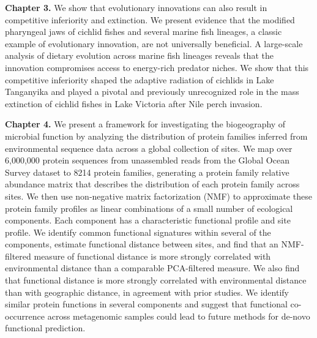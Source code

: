 \noindent\textbf{Chapter 3.} We show that evolutionary innovations can
also result in competitive inferiority and extinction. We present evidence
that the modified pharyngeal jaws of cichlid fishes and several marine fish
lineages, a classic example of evolutionary innovation, are not universally
beneficial. A large-scale analysis of dietary evolution across marine fish
lineages reveals that the innovation compromises access to energy-rich
predator niches. We show that this competitive inferiority shaped the adaptive
radiation of cichlids in Lake Tanganyika and played a pivotal and previously
unrecognized role in the mass extinction of cichlid fishes in Lake Victoria
after Nile perch invasion.


\noindent\textbf{Chapter 4.} We present a framework for
investigating the biogeography of microbial function by analyzing the
distribution of protein families inferred from environmental sequence data
across a global collection of sites. We map over 6,000,000 protein sequences
from unassembled reads from the Global Ocean Survey dataset to 8214 protein
families, generating a protein family relative abundance matrix that describes
the distribution of each protein family across sites. We then use non-negative
matrix factorization (NMF) to approximate these protein family profiles as
linear combinations of a small number of ecological components. Each component
has a characteristic functional profile and site profile. We identify common
functional signatures within several of the components, estimate functional
distance between sites, and find that an NMF-filtered measure of functional
distance is more strongly correlated with environmental distance than a
comparable PCA-filtered measure. We also find that functional distance is more
strongly correlated with environmental distance than with geographic distance,
in agreement with prior studies. We identify similar protein functions in
several components and suggest that functional co-occurrence across
metagenomic samples could lead to future methods for de-novo functional
prediction.

